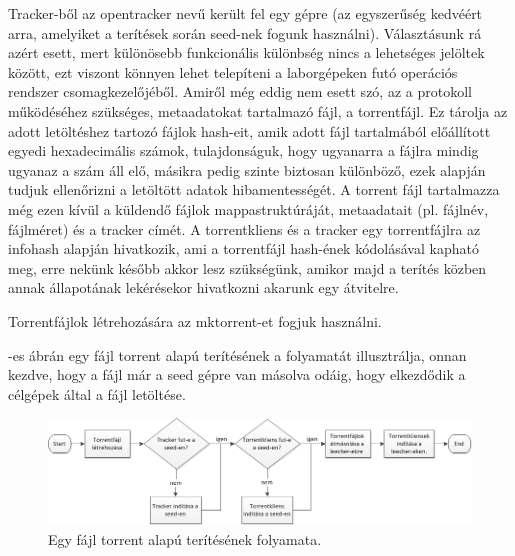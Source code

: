 Tracker-ből az opentracker nevű került fel egy gépre (az egyszerűség kedvéért arra, amelyiket a terítések során seed-nek fogunk használni). Választásunk rá azért esett, mert különösebb funkcionális különbség nincs a lehetséges jelöltek között, ezt viszont könnyen lehet telepíteni a laborgépeken futó operációs rendszer csomagkezelőjéből. Amiről még eddig nem esett szó, az a protokoll működéséhez szükséges, metaadatokat tartalmazó fájl, a torrentfájl. Ez tárolja az adott letöltéshez tartozó fájlok hash-eit, amik adott fájl tartalmából előállított egyedi hexadecimális számok, tulajdonságuk, hogy ugyanarra a fájlra mindig ugyanaz a szám áll elő, másikra pedig szinte biztosan különböző, ezek alapján tudjuk ellenőrizni a letöltött adatok hibamentességét. A torrent fájl tartalmazza még ezen kívül a küldendő fájlok mappastruktúráját, metaadatait (pl. fájlnév, fájlméret) és a tracker címét. A torrentkliens és a tracker egy torrentfájlra az infohash alapján hivatkozik, ami a torrentfájl hash-ének kódolásával kapható meg, erre nekünk később akkor lesz szükségünk, amikor majd a terítés közben annak állapotának lekérésekor hivatkozni akarunk egy átvitelre.

Torrentfájlok létrehozására az mktorrent-et\cite{mktorrent} fogjuk használni.

-es ábrán egy fájl torrent alapú terítésének a folyamatát illusztrálja, onnan kezdve, hogy a fájl már a seed gépre van másolva odáig, hogy elkezdődik a célgépek által a fájl letöltése.

\vspace{0.5cm}

\begin{figure}[ht]
	\centering
	\includegraphics[width=150mm, keepaspectratio]{figures/torrentflow.png}
	\caption{Egy fájl torrent alapú terítésének folyamata.}
	\label{fig:torrentflow}
\end{figure}


